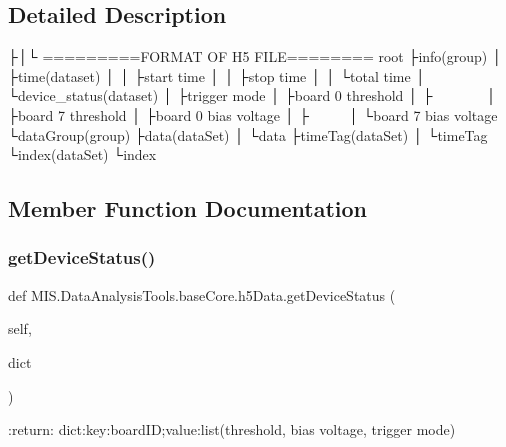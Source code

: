 \subsection{Detailed Description}
\begin{DoxyVerb}├│└
=========FORMAT OF H5 FILE========
root
 ├info(group)
 │ ├time(dataset)
 │ │ ├start time
 │ │ ├stop time
 │ │ └total time
 │ └device_status(dataset)
 │   ├trigger mode
 │   ├board 0 threshold
 │   ├~~~~~~~
 │   ├board 7 threshold
 │   ├board 0 bias voltage
 │   ├~~~~~
 │   └board 7 bias voltage
 └dataGroup(group)
    ├data(dataSet)
    │ └data
    ├timeTag(dataSet)
    │ └timeTag
    └index(dataSet)
      └index
\end{DoxyVerb}
 

\subsection{Member Function Documentation}
\mbox{\label{classMIS_1_1DataAnalysisTools_1_1baseCore_1_1h5Data_ac8f7d5abd31a594f4521af6791a033f2}} 
\subsubsection{\texorpdfstring{get\+Device\+Status()}{getDeviceStatus()}}
{\footnotesize\ttfamily def M\+I\+S.\+Data\+Analysis\+Tools.\+base\+Core.\+h5\+Data.\+get\+Device\+Status (\begin{DoxyParamCaption}\item[{}]{self,  }\item[{}]{dict }\end{DoxyParamCaption})}

\begin{DoxyVerb}:return: dict:key:boardID;value:list(threshold, bias voltage, trigger mode)
\end{DoxyVerb}
 \mbox{\label{classMIS_1_1DataAnalysisTools_1_1baseCore_1_1h5Data_ab0d245e4183cd69ff62b461f7ab94a71}} 
